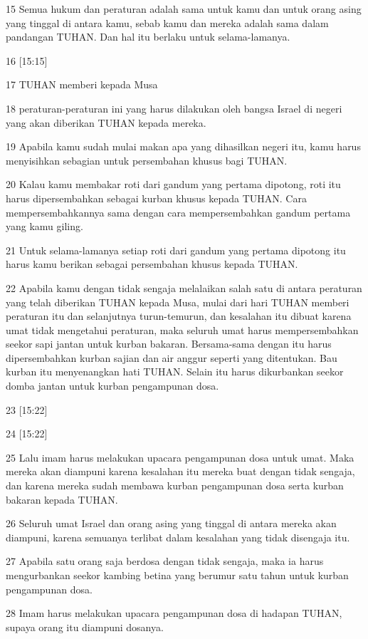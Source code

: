\par 15 Semua hukum dan peraturan adalah sama untuk kamu dan untuk orang asing yang tinggal di antara kamu, sebab kamu dan mereka adalah sama dalam pandangan TUHAN. Dan hal itu berlaku untuk selama-lamanya.
\par 16 [15:15]
\par 17 TUHAN memberi kepada Musa
\par 18 peraturan-peraturan ini yang harus dilakukan oleh bangsa Israel di negeri yang akan diberikan TUHAN kepada mereka.
\par 19 Apabila kamu sudah mulai makan apa yang dihasilkan negeri itu, kamu harus menyisihkan sebagian untuk persembahan khusus bagi TUHAN.
\par 20 Kalau kamu membakar roti dari gandum yang pertama dipotong, roti itu harus dipersembahkan sebagai kurban khusus kepada TUHAN. Cara mempersembahkannya sama dengan cara mempersembahkan gandum pertama yang kamu giling.
\par 21 Untuk selama-lamanya setiap roti dari gandum yang pertama dipotong itu harus kamu berikan sebagai persembahan khusus kepada TUHAN.
\par 22 Apabila kamu dengan tidak sengaja melalaikan salah satu di antara peraturan yang telah diberikan TUHAN kepada Musa, mulai dari hari TUHAN memberi peraturan itu dan selanjutnya turun-temurun, dan kesalahan itu dibuat karena umat tidak mengetahui peraturan, maka seluruh umat harus mempersembahkan seekor sapi jantan untuk kurban bakaran. Bersama-sama dengan itu harus dipersembahkan kurban sajian dan air anggur seperti yang ditentukan. Bau kurban itu menyenangkan hati TUHAN. Selain itu harus dikurbankan seekor domba jantan untuk kurban pengampunan dosa.
\par 23 [15:22]
\par 24 [15:22]
\par 25 Lalu imam harus melakukan upacara pengampunan dosa untuk umat. Maka mereka akan diampuni karena kesalahan itu mereka buat dengan tidak sengaja, dan karena mereka sudah membawa kurban pengampunan dosa serta kurban bakaran kepada TUHAN.
\par 26 Seluruh umat Israel dan orang asing yang tinggal di antara mereka akan diampuni, karena semuanya terlibat dalam kesalahan yang tidak disengaja itu.
\par 27 Apabila satu orang saja berdosa dengan tidak sengaja, maka ia harus mengurbankan seekor kambing betina yang berumur satu tahun untuk kurban pengampunan dosa.
\par 28 Imam harus melakukan upacara pengampunan dosa di hadapan TUHAN, supaya orang itu diampuni dosanya.
